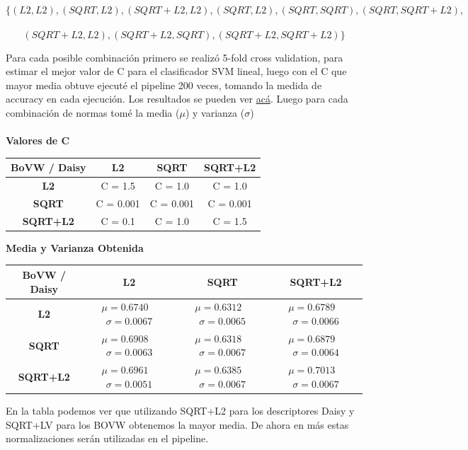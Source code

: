 \documentclass[11pt, spanish, a4paper]{article}
\begin{document}
$$\{(L2,L2),(SQRT,L2),(SQRT+L2,L2),(SQRT, L2),(SQRT, SQRT),(SQRT, SQRT+L2),$$ \ $$(SQRT+L2,L2),(SQRT+L2,SQRT),(SQRT+L2,SQRT+L2)\}$$

Para cada posible combinación primero se realizó 5-fold cross validation, para estimar el mejor valor de C para el clasificador SVM lineal, luego con el C que mayor media obtuve ejecuté el pipeline 200 veces, tomando la medida de accuracy en cada ejecución. Los resultados se pueden ver \href{https://drive.google.com/file/d/0BwdTazPY5OEDLURqZThwbDlkdDQ/view}{acá}. Luego para cada combinación de normas tomé la media (\(\mu\)) y varianza (\(\sigma\))\\
\\

\textbf{Valores de C}
\begin{center}
    \begin{tabular}{ | c | c | c | c |}
    \hline
    \textbf{BoVW / Daisy} & \textbf{L2} & \textbf{SQRT} & \textbf{SQRT+L2} \\ \hline
 	\textbf{L2} & C = 1.5 & C = 1.0 & C = 1.0\\ \hline
 	\textbf{SQRT} & C = 0.001  & C = 0.001  & C = 0.001  \\ \hline 
 	\textbf{SQRT+L2}  & C = 0.1 & C = 1.0 & C = 1.5\\ \hline
    \end{tabular}
\end{center}


\textbf{Media y Varianza Obtenida}
\begin{center}
    \begin{tabular}{ | c | c | c | c |}
    \hline
    \textbf{BoVW / Daisy} & \textbf{L2} & \textbf{SQRT} & \textbf{SQRT+L2} \\ \hline
 	\textbf{L2} & \(\mu =0.6740\) \ \(\sigma=0.0067\) & \(\mu = 0.6312\) \ \(\sigma= 0.0065\)  & \(\mu = 0.6789\) \ \(\sigma= 0.0066\)  \\ \hline
 	\textbf{SQRT} & \(\mu =  0.6908\) \ \(\sigma= 0.0063\)  & \(\mu =  0.6318\) \ \(\sigma= 0.0067\)  & \(\mu = 0.6879\) \ \(\sigma= 0.0064\)  \\ \hline 
 	\textbf{SQRT+L2}  & \(\mu = 0.6961\) \ \(\sigma= 0.0051\)  & \(\mu = 0.6385\) \ \(\sigma=  0.0067\)  & \(\mu = 0.7013\) \ \(\sigma= 0.0067\) \\ \hline
    \end{tabular}
\end{center}



En la tabla podemos ver que utilizando SQRT+L2 para los descriptores Daisy y SQRT+LV para los BOVW obtenemos la mayor media. De ahora en más estas normalizaciones serán utilizadas en el pipeline.
\end{document}
